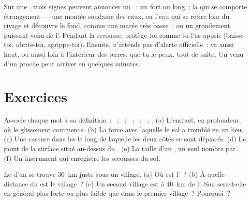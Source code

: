 \begin{remark}\label{rem:g7:earthquakes:natural-warning}
Sur une , trois signes peuvent annoncer un ~: un  fort ou
long~; la  qui se comporte étrangement --- une montée soudaine des eaux,
ou l'eau qui se retire loin du rivage et découvre le fond, comme une marée
très basse~; ou un grondement puissant venu de l'. Pendant la
secousse, protège-toi comme tu l'as appris (baisse-toi, abrite-toi,
agrippe-toi). Ensuite, n'attends pas d'alerte officielle~: va aussi haut,
ou aussi loin à l'intérieur des terres, que tu le peux, tout de suite. Un
 venu d'un  proche peut arriver en quelques minutes.
\end{remark}


\section{Exercices}

\begin{exercise}[$\star$]\label{exo:g7:earthquakes:1}
Associe chaque mot à sa définition~: ~; ~; ~;
~; ~; . (a) L'endroit, en profondeur, où le
glissement commence. (b) La force avec laquelle le sol a tremblé en un
lieu. (c) Une cassure dans les  le long de laquelle les deux côtés se
sont déplacés. (d) Le point de la surface situé au-dessus du . (e) La
taille d'un , un seul nombre par . (f) Un instrument qui
enregistre les secousses du sol.
\end{exercise}

\begin{exercise}[$\star$]\label{exo:g7:earthquakes:2}
Le  d'un  se trouve \qty{30}{km} juste sous un village.
(a) Où est l'~? (b) À quelle distance du  est le village~?
(c) Un second village est à \qty{40}{km} de l'. Son 
sera-t-elle en général plus forte ou plus faible que dans le premier
village~? Pourquoi~?
\end{exercise}

